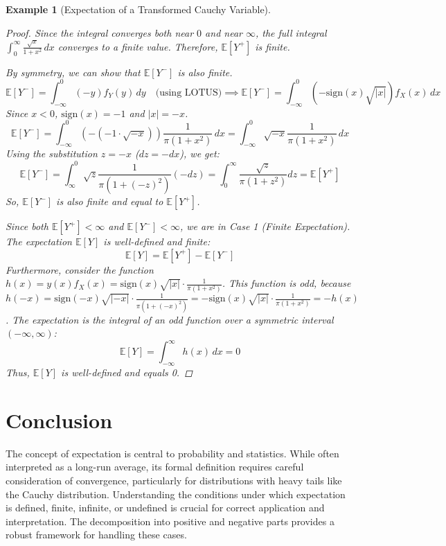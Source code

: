 \documentclass[11pt]{article}
\newtheorem{example}{Example}[section]       %
\theoremstyle{definition} %
\newcommand{\E}{\mathbb{E}}     %
\begin{document}
\begin{example}[Expectation of a Transformed Cauchy Variable]
\begin{proof}
Since the integral converges both near $0$ and near $\infty$, the full integral $\int_{0}^{\infty} \frac{\sqrt{x}}{1 + x^2} \, dx$ converges to a finite value. Therefore, $\E[Y^+]$ is finite.

By symmetry, we can show that $\E[Y^-]$ is also finite.
\[
\E[Y^-] = \int_{-\infty}^{0} (-y) f_Y(y) \, dy \quad \text{(using LOTUS)} \implies \E[Y^-] = \int_{-\infty}^{0} (-\text{sign}(x)\sqrt{|x|}) f_X(x) \, dx
\]
Since $x < 0$, $\text{sign}(x) = -1$ and $|x| = -x$.
\[
\E[Y^-] = \int_{-\infty}^{0} (-( -1 \cdot \sqrt{-x})) \frac{1}{\pi(1+x^2)} \, dx = \int_{-\infty}^{0} \sqrt{-x} \frac{1}{\pi(1+x^2)} \, dx
\]
Using the substitution $z = -x$ ($dz = -dx$), we get:
\[
\E[Y^-] = \int_{\infty}^{0} \sqrt{z} \frac{1}{\pi(1+(-z)^2)} (-dz) = \int_{0}^{\infty} \frac{\sqrt{z}}{\pi(1+z^2)} dz = \E[Y^+]
\]
So, $\E[Y^-]$ is also finite and equal to $\E[Y^+]$.

Since both $\E[Y^+] < \infty$ and $\E[Y^-] < \infty$, we are in Case 1 (Finite Expectation). The expectation $\E[Y]$ is well-defined and finite:
\[
\E[Y] = \E[Y^+] - \E[Y^-]
\]
Furthermore, consider the function $h(x) = y(x) f_X(x) = \text{sign}(x)\sqrt{|x|} \cdot \frac{1}{\pi(1+x^2)}$.
This function is odd, because $h(-x) = \text{sign}(-x)\sqrt{|-x|} \cdot \frac{1}{\pi(1+(-x)^2)} = -\text{sign}(x)\sqrt{|x|} \cdot \frac{1}{\pi(1+x^2)} = -h(x)$.
The expectation is the integral of an odd function over a symmetric interval $(-\infty, \infty)$:
\[
\E[Y] = \int_{-\infty}^{\infty} h(x) \, dx = 0
\]
Thus, $\E[Y]$ is well-defined and equals 0.
\end{proof}
\end{example}

\section{Conclusion}
\label{sec:conclusion}

The concept of expectation is central to probability and statistics. While often interpreted as a long-run average, its formal definition requires careful consideration of convergence, particularly for distributions with heavy tails like the Cauchy distribution. Understanding the conditions under which expectation is defined, finite, infinite, or undefined is crucial for correct application and interpretation. The decomposition into positive and negative parts provides a robust framework for handling these cases.
\end{document}
